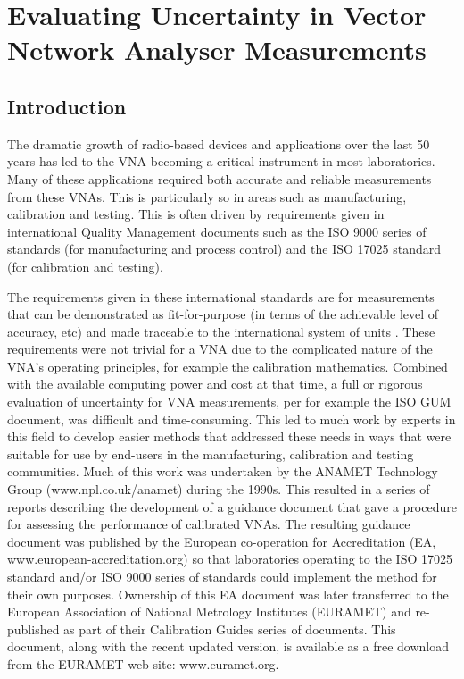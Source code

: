 \documentclass[../thesis/thesis.tex]{subfiles}
\begin{document}
	
\onlyinsubfile{\setcounter{chapter}{3}}

\chapter[Evaluating Uncertainty in VNA Measurements]{Evaluating Uncertainty in Vector \\Network Analyser Measurements}

\section{Introduction}

The dramatic growth of radio-based devices and applications over the last 50 years has led to the VNA becoming a critical instrument in most laboratories. Many of these applications required both accurate and reliable measurements from these VNAs.  This is particularly so in areas such as manufacturing, calibration and testing.  This is often driven by requirements given in international Quality Management documents such as the ISO 9000 series of standards \cite{ISO9000} (for manufacturing and process control) and the ISO 17025 standard \cite{ISO17025} (for calibration and testing).

The requirements given in these international standards are for measurements that can be demonstrated as fit-for-purpose (in terms of the achievable level of accuracy, etc) and made traceable to the international system of units \cite{SI_2019, SI_2019B}.  These requirements were not trivial for a VNA due to the complicated nature of the VNA’s operating principles, for example the calibration mathematics. Combined with the available computing power and cost at that time, a full or rigorous evaluation of uncertainty for VNA measurements, per for example the ISO GUM document, was difficult and time-consuming. This led to much work by experts in this field to develop easier methods that addressed these needs in ways that were suitable for use by end-users in the manufacturing, calibration and testing communities.  Much of this work was undertaken by the ANAMET Technology Group (www.npl.co.uk/anamet) during the 1990s.  This resulted in a series of reports \cite{ANAMET_1996, ANAMET_1998, ANAMET_1999} describing the development of a guidance document that gave a procedure for assessing the performance of calibrated VNAs.  The resulting guidance document \cite{EA_2000} was published by the European co-operation for Accreditation (EA, www.european-accreditation.org) so that laboratories operating to the ISO 17025 standard and/or ISO 9000 series of standards could implement the method for their own purposes.  Ownership of this EA document was later transferred to the European Association of National Metrology Institutes (EURAMET) and re-published \cite{EURAMET_2011} as part of their Calibration Guides series of documents. This document, along with the recent updated version, is available as a free download from the EURAMET web-site: www.euramet.org.
\end{document}
